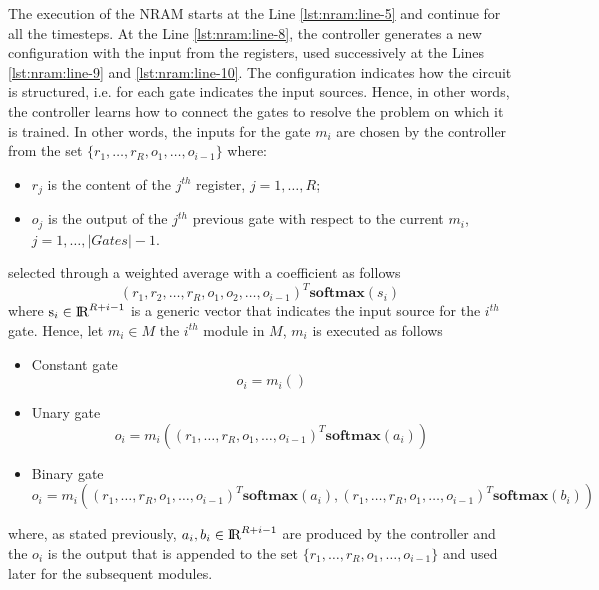 The execution of the NRAM starts at the Line \ref{lst:nram:line-5} and continue for all the timesteps. At the Line \ref{lst:nram:line-8}, the controller generates a new configuration with the input from the registers, used successively at the Lines \ref{lst:nram:line-9} and \ref{lst:nram:line-10}. The configuration indicates how the circuit is structured, i.e. for each gate indicates the input sources. Hence, in other words, the controller learns how to connect the gates to resolve the problem on which it is trained. In other words, the inputs for the gate $m_i$ are chosen by the controller from the set $\{r_{1}, \dots, r_{R}, o_{1}, \dots, o_{i-1}\}$ where:
\begin{itemize}
	\item $r_j$ is the content of the $j^{th}$ register, $j=1,\dots,R$;
	\item $o_j$ is the output of the $j^{th}$ previous gate with respect to the current $m_i$, $j=1,\dots,|Gates| - 1$.
\end{itemize}
selected through a weighted average with a coefficient as follows
\begin{equation}
	(r_1, r_2, \dots, r_R, o_1, o_2, \dots, o_{i-1})^T\textbf{softmax}(s_i)
\end{equation}
where $\textrm{s}_i \in \textrm{I\!R}^{R+i-1}$ is a generic vector that indicates the input source for the $i^{th}$ gate. \newline
Hence, let $m_i \in M$ the $i^{th}$ module in $M$, $m_i$ is executed as follows
\begin{itemize}
	\item{Constant gate
		\begin{equation}
			o_i = m_i()
		\end{equation}
	}
	\item{Unary gate
		\begin{equation}
			o_i = m_i((r_1, \dots, r_R, o_1, \dots, o_{i-1})^T\textbf{softmax}(a_i))
		\end{equation}
	}
	\item{Binary gate
		\begin{equation}
			o_i = m_i((r_1, \dots, r_R, o_1, \dots, o_{i-1})^T\textbf{softmax}(a_i), (r_1, \dots, r_R, o_1, \dots, o_{i-1})^T\textbf{softmax}(b_i))
		\end{equation}
	}
\end{itemize}
where, as stated previously, $a_i, b_i \in \textrm{I\!R}^{R+i-1}$ are produced by the controller and the $o_i$ is the output that is appended to the set $\{r_{1}, \dots, r_{R}, o_{1}, \dots, o_{i-1}\}$ and used later for the subsequent modules.
